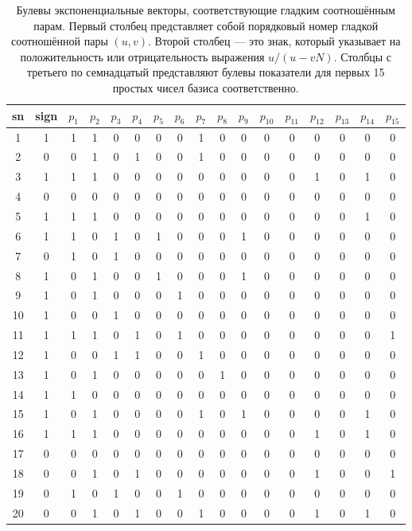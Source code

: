 \begin{table}[H]
\centering
\caption{
    Булевы экспоненциальные векторы, соответствующие гладким соотношённым
    парам. Первый столбец представляет собой порядковый номер гладкой
    соотношённой пары $(u, v)$. Второй столбец — это знак, который указывает на
    положительность или отрицательность выражения $u / (u - vN)$. Столбцы с
    третьего по семнадцатый представляют булевы показатели для первых 15
    простых чисел базиса соответственно.
}
\begin{tabular}{c|c|*{15}{c}}
\hline
\hline
\textbf{sn} & \textbf{sign} & $p_1$ & $p_2$ & $p_3$ & $p_4$ & $p_5$ & $p_6$ & $p_7$ & $p_8$ & $p_9$ & $p_{10}$ & $p_{11}$ & $p_{12}$ & $p_{13}$ & $p_{14}$ & $p_{15}$ \\
\hline
1 & 1 & 1 & 1 & 0 & 0 & 0 & 0 & 1 & 0 & 0 & 0 & 0 & 0 & 0 & 0 & 0 \\
2 & 0 & 0 & 1 & 0 & 1 & 0 & 0 & 1 & 0 & 0 & 0 & 0 & 0 & 0 & 0 & 0 \\
3 & 1 & 1 & 1 & 0 & 0 & 0 & 0 & 0 & 0 & 0 & 0 & 0 & 1 & 0 & 1 & 0 \\
4 & 0 & 0 & 0 & 0 & 0 & 0 & 0 & 0 & 0 & 0 & 0 & 0 & 0 & 0 & 0 & 0 \\
5 & 1 & 1 & 1 & 0 & 0 & 0 & 0 & 0 & 0 & 0 & 0 & 0 & 0 & 0 & 1 & 0 \\
6 & 1 & 1 & 0 & 1 & 0 & 1 & 0 & 0 & 0 & 1 & 0 & 0 & 0 & 0 & 0 & 0 \\
7 & 0 & 1 & 0 & 1 & 0 & 0 & 0 & 0 & 0 & 0 & 0 & 0 & 0 & 0 & 0 & 0 \\
8 & 1 & 0 & 1 & 0 & 0 & 1 & 0 & 0 & 0 & 1 & 0 & 0 & 0 & 0 & 0 & 0 \\
9 & 1 & 0 & 1 & 0 & 0 & 0 & 1 & 0 & 0 & 0 & 0 & 0 & 0 & 0 & 0 & 0 \\
10 & 1 & 0 & 0 & 1 & 0 & 0 & 0 & 0 & 0 & 0 & 0 & 0 & 0 & 0 & 0 & 0 \\
11 & 1 & 1 & 1 & 0 & 1 & 0 & 1 & 0 & 0 & 0 & 0 & 0 & 0 & 0 & 0 & 1 \\
12 & 1 & 0 & 0 & 1 & 1 & 0 & 0 & 1 & 0 & 0 & 0 & 0 & 0 & 0 & 0 & 0 \\
13 & 1 & 0 & 1 & 0 & 0 & 0 & 0 & 0 & 1 & 0 & 0 & 0 & 0 & 0 & 0 & 0 \\
14 & 1 & 1 & 0 & 0 & 0 & 0 & 0 & 0 & 0 & 0 & 0 & 0 & 0 & 0 & 0 & 0 \\
15 & 1 & 0 & 1 & 0 & 0 & 0 & 0 & 1 & 0 & 1 & 0 & 0 & 0 & 0 & 1 & 0 \\
16 & 1 & 1 & 1 & 0 & 0 & 0 & 0 & 0 & 0 & 0 & 0 & 0 & 1 & 0 & 1 & 0 \\
17 & 0 & 0 & 0 & 0 & 0 & 0 & 0 & 0 & 0 & 0 & 0 & 0 & 0 & 0 & 0 & 0 \\
18 & 0 & 0 & 1 & 0 & 1 & 0 & 0 & 0 & 0 & 0 & 0 & 0 & 1 & 0 & 0 & 1 \\
19 & 0 & 1 & 0 & 1 & 0 & 0 & 1 & 0 & 0 & 0 & 0 & 0 & 0 & 0 & 0 & 0 \\
20 & 0 & 0 & 1 & 0 & 1 & 0 & 0 & 1 & 0 & 0 & 0 & 0 & 1 & 0 & 1 & 0 \\
\hline
\hline
\end{tabular}
\end{table}

